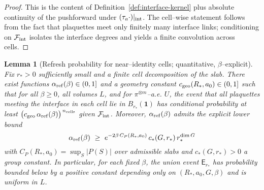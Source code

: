 \documentclass[11pt]{amsart}
\theoremstyle{plain}
\newtheorem{lemma}[theorem]{Lemma}
\theoremstyle{definition}
\theoremstyle{remark}
\begin{document}
\begin{proof}
This is the content of Definition~\ref{def:interface-kernel} plus absolute continuity of the pushforward under $(\tau_a \cdot)|_{\rm int}$. The cell–wise statement follows from the fact that plaquettes meet only finitely many interface links; conditioning on $\mathcal F_{\rm int}$ isolates the interface degrees and yields a finite convolution across cells.
\end{proof}
\begin{lemma}[Refresh probability for near–identity cells; quantitative, $\beta$–explicit]\label{lem:refresh-prob}
Fix $r_*>0$ sufficiently small and a finite cell decomposition of the slab. There exist functions $\alpha_{\rm ref}(\beta)\in(0,1]$ and a geometry constant $c_{\rm geo}(R_*,a_0)\in(0,1]$ such that for all $\beta\ge 0$, all volumes $L$, and for $\pi^{\otimes m}$–a.e. $U$, the event that all plaquettes meeting the interface in each cell lie in $B_{r_*}(\mathbf 1)$ has conditional probability at least $\big(c_{\rm geo}\,\alpha_{\rm ref}(\beta)\big)^{\,n_{\rm cells}}$ given $\mathcal F_{\rm int}$. Moreover, $\alpha_{\rm ref}(\beta)$ admits the explicit lower bound
\[
  \alpha_{\rm ref}(\beta)\ \ge\ e^{-2\beta\,C_P(R_*,a_0)}\,c_*(G,r_*)\,r_*^{\dim G}
\]
with $C_P(R_*,a_0)=\sup_S |P(S)|$ over admissible slabs and $c_*(G,r_*)>0$ a group constant. In particular, for each fixed $\beta$, the union event $\mathsf E_{r_*}$ has probability bounded below by a positive constant depending only on $(R_*,a_0,G,\beta)$ and is uniform in $L$.
\end{lemma}
\end{document}
